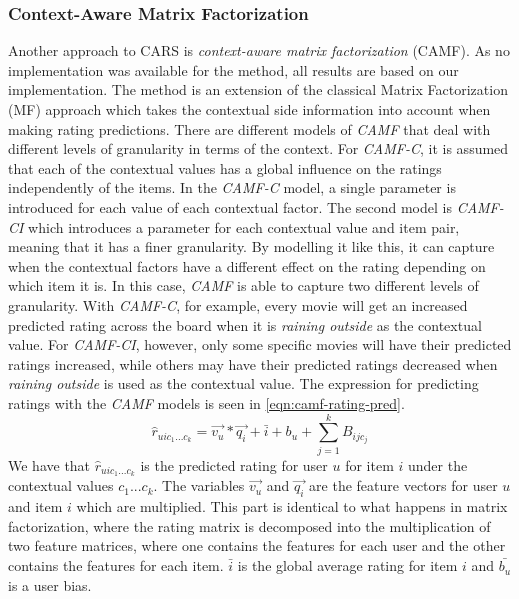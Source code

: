 \subsubsection{Context-Aware Matrix Factorization}\label{subsec:camf}
Another approach to CARS is \textit{context-aware matrix factorization} (CAMF)\cite{baltrunasCAMF}.
As no implementation was available for the method, all results are based on our implementation.
The method is an extension of the classical Matrix Factorization (MF) approach which takes the contextual side information into account when making rating predictions.
There are different models of \textit{CAMF} that deal with different levels of granularity in terms of the context.
For \textit{CAMF-C}, it is assumed that each of the contextual values has a global influence on the ratings independently of the items.
In the \textit{CAMF-C} model, a single parameter is introduced for each value of each contextual factor.
The second model is \textit{CAMF-CI} which introduces a parameter for each contextual value and item pair, meaning that it has a finer granularity.
By modelling it like this, it can capture when the contextual factors have a different effect on the rating depending on which item it is.
In this case, \textit{CAMF} is able to capture two different levels of granularity.
With \textit{CAMF-C}, for example, every movie will get an increased predicted rating across the board when it is \textit{raining outside} as the contextual value.
For \textit{CAMF-CI}, however, only some specific movies will have their predicted ratings increased, while others may have their predicted ratings decreased when \textit{raining outside} is used as the contextual value.
The expression for predicting ratings with the \textit{CAMF} models is seen in \autoref{eqn:camf-rating-pred}.
\begin{equation}
    \label{eqn:camf-rating-pred}
    \hat{r}_{uic_1...c_k} = \vec{v_u} * \vec{q_i} + \bar{i} + b_u + \sum\limits_{j = 1}^k B_{ijc_j}
\end{equation}
We have that $\hat{r}_{uic_1...c_k}$ is the predicted rating for user $u$ for item $i$ under the contextual values $c_1...c_k$.
The variables $\vec{v_u} $ and $ \vec{q_i}$ are the feature vectors for user $u$ and item $i$ which are multiplied.
This part is identical to what happens in matrix factorization, where the rating matrix is decomposed into the multiplication of two feature matrices, where one contains the features for each user and the other contains the features for each item.
$\bar{i}$ is the global average rating for item $i$ and $\bar{b_u}$ is a user bias.
